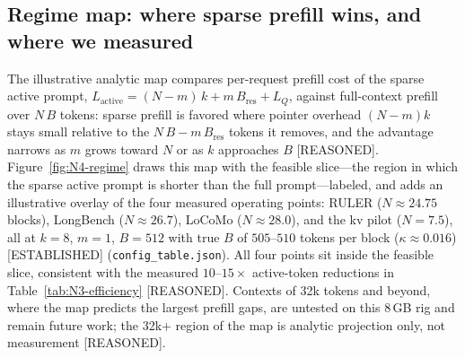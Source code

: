 \label{sec:regime}

\subsection{Regime map: where sparse prefill wins, and where we measured}
\label{sec:regime-map}

The illustrative analytic map compares per-request prefill cost of the sparse active
prompt, $L_{\mathrm{active}} = (N-m)\,k + m\,B_{\mathrm{res}} + L_Q$, against
full-context prefill over $N\,B$ tokens: sparse prefill is favored where
pointer overhead $(N-m)k$ stays small relative to the $N\,B - m\,B_{\mathrm{res}}$
tokens it removes, and the advantage narrows as $m$ grows toward $N$ or as
$k$ approaches $B$ [REASONED]. Figure~\ref{fig:N4-regime} draws this map
with the feasible slice---the region in which the sparse active prompt is
shorter than the full prompt---labeled, and adds an illustrative overlay of the four measured
operating points: RULER ($N \approx 24.75$ blocks), LongBench ($N \approx
26.7$), LoCoMo ($N \approx 28.0$), and the kv pilot ($N = 7.5$), all at
$k=8$, $m=1$, $B=512$ with true $B$ of $505$--$510$ tokens per block
($\kappa \approx 0.016$) [ESTABLISHED] (\texttt{config\_table.json}).
All four points sit inside the feasible slice, consistent with the measured
$10$--$15\times$ active-token reductions in Table~\ref{tab:N3-efficiency}
[REASONED]. Contexts of 32k tokens and beyond, where the map predicts the
largest prefill gaps, are untested on this 8\,GB rig and remain future work;
the 32k+ region of the map is analytic projection only, not measurement [REASONED].

